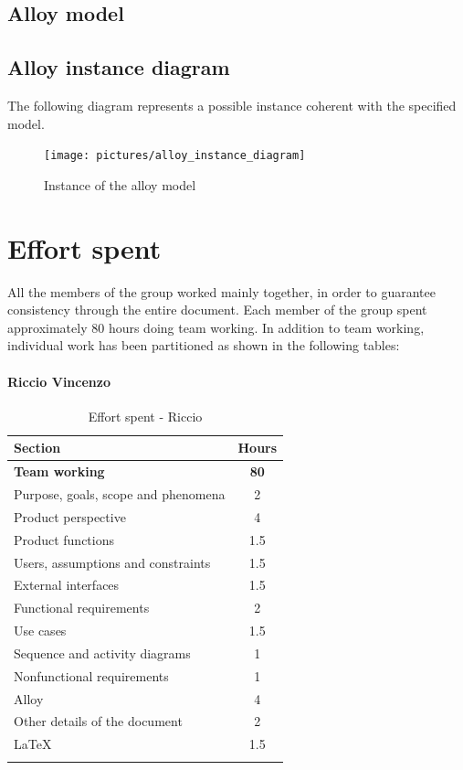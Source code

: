 \documentclass[a4paper,oneside,11pt]{book}   %
\begin{document}
    \section{Alloy model}
    
    \newpage
    \section{Alloy instance diagram}
    The following diagram represents a possible instance coherent with the specified model.
    \begin{figure}[H]
        \centering
        \texttt{[image: pictures/alloy\_instance\_diagram]}
        \caption{Instance of the alloy model}
        \label{figure:alloy_instance}
    \end{figure}

    
\chapter{Effort spent}
    All the members of the group worked mainly together, in order to guarantee consistency through the entire document. Each member of the group spent approximately 80 hours doing team working. In addition to team working, individual work has been partitioned as shown in the following tables:
    \subsubsection{Riccio Vincenzo}
    \begin{longtable}[c]{|V{.55\textwidth}|c|}
        \hline
        \textbf{Section} & {\bfseries{Hours}} \\ \hline
        \textbf{Team working} & \textbf{80} \\ \hline
        Purpose, goals, scope and phenomena & 2 \\ \hline
        Product perspective & 4 \\ \hline
        Product functions & 1.5 \\ \hline
        Users, assumptions and constraints & 1.5 \\ \hline
        External interfaces & 1.5 \\ \hline
        Functional requirements & 2 \\ \hline
        Use cases & 1.5 \\ \hline
        Sequence and activity diagrams & 1 \\ \hline
        Nonfunctional requirements & 1 \\ \hline
        Alloy & 4 \\ \hline
        Other details of the document & 2 \\ \hline
        \LaTeX & 1.5 \\
        \hline
        \caption{Effort spent - Riccio}
        \label{table:effort_riccio}
    \end{longtable}
    
\end{document}
